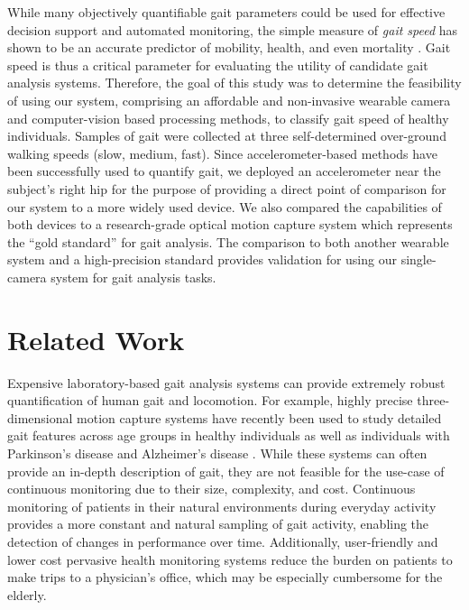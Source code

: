 \documentclass[12pt]{report}
\begin{document}
While many objectively quantifiable gait parameters could be used for effective decision support and automated monitoring, the simple measure of \textit{gait speed} has shown to be an accurate predictor of mobility, health, and even mortality \cite{Afilalo2010GaitSurgery, Viccaro2011GaitForce, Fitzpatrick2007AssociationsPersons}. Gait speed is thus a critical parameter for evaluating the utility of candidate gait analysis systems. Therefore, the goal of this study was to determine the feasibility of using our system, comprising an affordable and non-invasive wearable camera and computer-vision based processing methods, to classify gait speed of healthy individuals. Samples of gait were collected at three self-determined over-ground walking speeds (slow, medium, fast). Since accelerometer-based methods have been successfully used to quantify gait, we deployed an accelerometer near the subject's right hip for the purpose of providing a direct point of comparison for our system to a more widely used device. We also compared the capabilities of both devices to a research-grade optical motion capture system which represents the ``gold standard'' for gait analysis. The comparison to both another wearable system and a high-precision standard provides validation for using our single-camera system for gait analysis tasks.

\section{Related Work}
Expensive laboratory-based gait analysis systems can provide extremely robust quantification of human gait and locomotion. For example, highly precise three-dimensional motion capture systems have recently been used to study detailed gait features across age groups in healthy individuals \cite{Chien2015TheIndividuals} as well as individuals with Parkinson's disease \cite{Corona2016QuantitativeDisease} and Alzheimer's disease \cite{Rucco2017Spatio-temporalCapture}. While these systems can often provide an in-depth description of gait, they are not feasible for the use-case of continuous monitoring due to their size, complexity, and cost. Continuous monitoring of patients in their natural environments during everyday activity provides a more constant and natural sampling of gait activity, enabling the detection of changes in performance over time. Additionally, user-friendly and lower cost pervasive health monitoring systems reduce the burden on patients to make trips to a physician's office, which may be especially cumbersome for the elderly.
\end{document}
